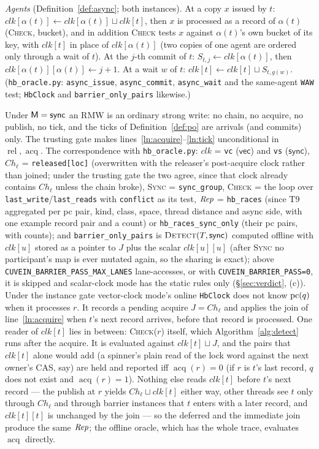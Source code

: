 \documentclass[11pt]{article}
\theoremstyle{remark}
\DeclareMathOperator{\rel}{rel}\DeclareMathOperator{\acq}{acq}\DeclareMathOperator{\key}{key}
\newcommand{\clk}{\mathit{clk}}\newcommand{\Bk}{B}\newcommand{\Ch}{\mathit{Ch}}\newcommand{\lastr}{\mathit{last}}
\begin{document}
\medskip\noindent
\emph{Agents} (Definition~\ref{def:async}; both instances). At a copy $x$ issued by $t$:
$\clk[\alpha(t)]\gets\clk[\alpha(t)]\sqcup\clk[t]$, then $x$ is processed as a record of
$\alpha(t)$ (\textsc{Check}, bucket), and in addition \textsc{Check} tests $x$ against
$\alpha(t)$'s own bucket of its key, with $\clk[t]$ in place of $\clk[\alpha(t)]$ (two copies
of one agent are ordered only through a wait of $t$). At the $j$-th commit of $t$:
$S_{t,j}\gets\clk[\alpha(t)]$, then $\clk[\alpha(t)][\alpha(t)]\gets j+1$. At a wait $w$ of $t$:
$\clk[t]\gets\clk[t]\sqcup S_{t,g(w)}$. (\texttt{hb\_oracle.py}: \texttt{async\_issue},
\texttt{async\_commit}, \texttt{async\_wait} and the same-agent \texttt{WAW} test; \texttt{HbClock}
and \texttt{barrier\_only\_pairs} likewise.)

\medskip\noindent
Under $\mathsf{M}=\mathsf{sync}$ an RMW is an ordinary strong write: no chain, no acquire, no
publish, no tick, and the ticks of Definition~\ref{def:po} are arrivals (and commits) only. The
trusting gate makes lines~\ref{ln:acquire}--\ref{ln:tick} unconditional in $\rel,\acq$.
The correspondence with \texttt{hb\_oracle.py}: $\clk$ = \texttt{vc} ($\mathsf{vec}$) and
\texttt{vs} ($\mathsf{sync}$), $\Ch_\ell$ = \texttt{released[loc]} (overwritten with the
releaser's post-acquire clock rather than joined; under the trusting gate the two agree,
since that clock already contains $\Ch_\ell$ unless the chain broke), \textsc{Sync} =
\texttt{sync\_group}, \textsc{Check} = the loop over \texttt{last\_write}/\texttt{last\_reads}
with \texttt{conflict} as its test, $\mathit{Rep}$ = \texttt{hb\_races} (since T9 aggregated per pc pair, kind, class, space, thread
distance and async side, with one example record pair and a count) or
\texttt{hb\_races\_sync\_only} (their pc pairs, with counts); and \texttt{barrier\_only\_pairs} is
$\textsc{Detect}(T,\mathsf{sync})$ computed offline with $\clk[u]$ stored as a pointer to
$J$ plus the scalar $\clk[u][u]$ (after \textsc{Sync} no participant's map is ever
mutated again, so the sharing is exact); above \texttt{CUVEIN\_BARRIER\_PASS\_MAX\_LANES}
lane-accesses, or with \texttt{CUVEIN\_BARRIER\_PASS=0}, it is skipped and scalar-clock mode
has the static rules only (\S\ref{sec:verdict}, (c)). Under the instance gate vector-clock mode's online \texttt{HbClock} does
not know $\operatorname{pc}(q)$ when it processes $r$. It records a pending acquire $J=\Ch_\ell$ and
applies the join of line~\ref{ln:acquire} when $t$'s next record arrives, before that
record is processed. One reader of $\clk[t]$ lies in between: \textsc{Check}($r$) itself,
which Algorithm~\ref{alg:detect} runs after the acquire. It is evaluated against
$\clk[t]\sqcup J$, and the pairs that $\clk[t]$ alone would add (a spinner's plain read of
the lock word against the next owner's CAS, say) are held and reported iff $\acq(r)=0$ (if
$r$ is $t$'s last record, $q$ does not exist and $\acq(r)=1$).
Nothing else reads $\clk[t]$ before $t$'s next record --- the publish at $r$ yields
$\Ch_\ell\sqcup\clk[t]$ either way, other threads see $t$ only through $\Ch_\ell$ and
through barrier instances that $t$ enters with a later record, and $\clk[t][t]$ is
unchanged by the join --- so the deferred and the immediate join produce the same $\mathit{Rep}$;
the offline oracle, which has the whole trace, evaluates $\acq$ directly.
\end{document}
